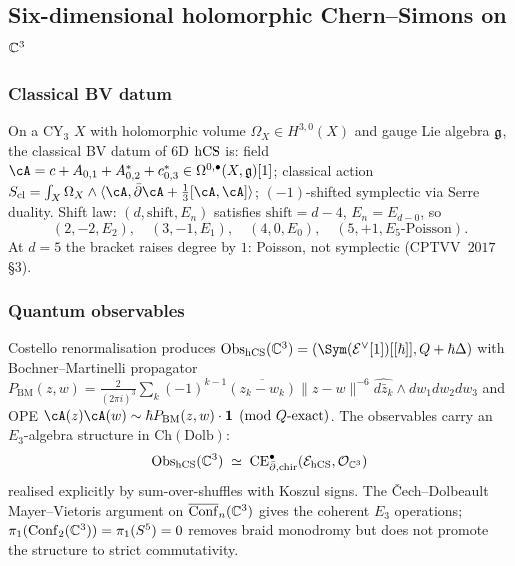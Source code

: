 \subsection{Six-dimensional holomorphic Chern--Simons on $\mathbb{C}^3$}
\label{wn:subsec:plat-6d-hCS}

\subsubsection{Classical BV datum}

\begin{theorem}\ClaimStatusTheorem
\label{wn:thm:plat-hCS-classical}
On a CY$_3$ $X$ with holomorphic volume $\Omega_X \in H^{3,0}(X)$ and
gauge Lie algebra $\mathfrak{g}$, the classical BV datum of 6D $\mathrm{hCS}$ is:
field $\cA = c + A_{0,1} + A^*_{0,2} + c^*_{0,3} \in
\Omega^{0,\bullet}(X, \fg)[1]$; classical action
$S_{\mathrm{cl}} = \int_X \Omega_X \wedge
\langle \cA, \bar\partial \cA + \tfrac{1}{3}[\cA, \cA]\rangle$;
$(-1)$-shifted symplectic via Serre duality.
Shift law: $(d, \mathrm{shift}, E_n)$ satisfies $\mathrm{shift} = d - 4$,
$E_n = E_{d{-}0}$, so
\[
(2, -2, E_2),\quad (3, -1, E_1),\quad (4, 0, E_0),\quad
(5, +1, E_5\text{-Poisson}).
\]
At $d=5$ the bracket raises degree by $1$: Poisson, not symplectic
(CPTVV~$2017$ \S3).
\end{theorem}

\subsubsection{Quantum observables}

\begin{theorem}\ClaimStatusTheorem
\label{wn:thm:plat-hCS-quantum}
Costello renormalisation produces
$\Obs_{\hCS}(\CC^3) = (\Sym(\cE^\vee[1])[[\hbar]], Q + \hbar\Delta)$
with Bochner--Martinelli propagator
$P_{\mathrm{BM}}(z,w) = \tfrac{2}{(2\pi i)^3}
\sum_k (-1)^{k-1} \overline{(z_k - w_k)} \|z-w\|^{-6}
\widehat{d\bar z_k} \wedge dw_1 dw_2 dw_3$
and OPE $\cA(z)\cA(w) \sim \hbar P_{\mathrm{BM}}(z,w) \cdot \mathbf{1}
\pmod{Q\text{-exact}}$.
The observables carry an $E_3$-algebra structure in $\mathrm{Ch}(\mathrm{Dolb})$:
\[
\mathrm{Obs}_{\mathrm{hCS}}(\mathbb{C}^3) \;\simeq\; \mathrm{CE}^\bullet_{\bar\partial,\mathrm{chir}}
(\mathcal{E}_{\mathrm{hCS}}, \mathcal{O}_{\mathbb{C}^3})
\]
realised explicitly by sum-over-shuffles with Koszul signs.  The
\v{C}ech--Dolbeault Mayer--Vietoris argument on
$\overline{\mathrm{Conf}}_n(\mathbb{C}^3)$ gives the coherent $E_3$ operations;
$\pi_1(\mathrm{Conf}_2(\mathbb{C}^3))=\pi_1(S^5)=0$ removes braid monodromy but
does not promote the structure to strict commutativity.
\end{theorem}


